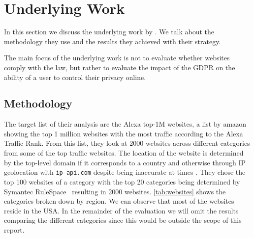 \section{Underlying Work}
\label{sec:underlying}

In this section we discuss the underlying work by . We talk about the methodology they use and the
results they achieved with their strategy.

The main focus of the underlying work is not to evaluate whether websites comply with the law, but rather to evaluate
the impact of the GDPR on the ability of a user to control their privacy online.

\subsection{Methodology}
\label{subsec:methodology}

The target list of their analysis are the Alexa top-1M websites, a list by amazon showing the top 1 million websites with
the most traffic according to the Alexa Traffic Rank. From this list, they look at 2000 websites across different
categories from some of the top traffic websites. The location of the website is determined by the top-level domain 
if it corresponds to a country and otherwise through IP geolocation with \texttt{ip-api.com} despite being inaccurate at
times \cite{weinberg2018catch}. They chose the top 100 websites of a category with the top 20 categories being determined
by Symantec RuleSpace~\cite{symantec} resulting in 2000 websites. \autoref{tab:websites} shows the categories broken
down by region. We can observe that most of the websites reside in the USA. In the remainder of the evaluation we will omit the
results comparing the different categories since this would be outside the scope of this report.

